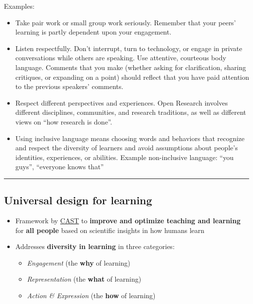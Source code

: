 \documentclass[
  letterpaper,
  DIV=11,
  numbers=noendperiod]{scrartcl}
\providecommand{\tightlist}{%
  \setlength{\itemsep}{0pt}\setlength{\parskip}{0pt}}
\begin{document}
Examples:

\begin{itemize}
\tightlist
\item
  Take pair work or small group work seriously. Remember that your
  peers' learning is partly dependent upon your engagement.
\item
  Listen respectfully. Don't interrupt, turn to technology, or engage in
  private conversations while others are speaking. Use attentive,
  courteous body language. Comments that you make (whether asking for
  clarification, sharing critiques, or expanding on a point) should
  reflect that you have paid attention to the previous speakers'
  comments.
\item
  Respect different perspectives and experiences. Open Research involves
  different disciplines, communities, and research traditions, as well
  as different views on ``how research is done''.
\item
  Using inclusive language means choosing words and behaviors that
  recognize and respect the diversity of learners and avoid assumptions
  about people's identities, experiences, or abilities. Example
  non-inclusive language: ``you guys'', ``everyone knows that''
\end{itemize}

\begin{center}\rule{0.5\linewidth}{0.5pt}\end{center}

\subsection{Universal design for
learning}\label{universal-design-for-learning}

\begin{itemize}
\tightlist
\item
  Framework by \href{https://www.cast.org/}{CAST} to \textbf{improve and
  optimize teaching and learning} for \textbf{all people} based on
  scientific insights in how humans learn
\item
  Addresses \textbf{diversity in learning} in three categories:

  \begin{itemize}
  \tightlist
  \item
    \emph{Engagement} (the \textbf{why} of learning)
  \item
    \emph{Representation} (the \textbf{what} of learning)
  \item
    \emph{Action \& Expression} (the \textbf{how} of learning)
  \end{itemize}
\end{itemize}
\end{document}
